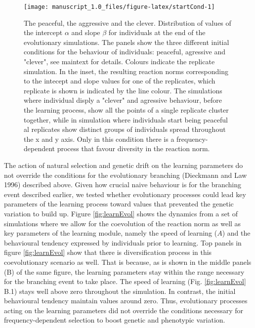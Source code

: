 \documentclass[
  12pt,
]{article}
\begin{document}
\begin{figure}

{\centering \texttt{[image: manuscript\_1.0\_files/figure-latex/startCond-1]} 

}

\caption{The peaceful, the aggressive and the clever. Distribution of values of the intercept $\alpha$ and slope $\beta$ for individuals at the end of the evolutionary simulations. The panels show the three different initial conditions for the behaviour of individuals: peaceful, agressive and  "clever", see maintext for details. Colours indicate the replicate simulation. In the inset, the resulting reaction norms corresponding to the intecept and slope values for one of the replicates, which replicate is shown is indicated by the line colour. The simulations where individual disply a "clever" and agressive behaviour, before the learning process, show all the points of a single replicate cluster together, while in simulation where individuals start being peaceful al replicates show distinct groups of individuals spread throughout the x and y axis. Only in this condition there is a frequency-dependent process that favour diversity in the reaction norm.}\label{fig:startCond}
\end{figure}

The action of natural selection and genetic drift on the learning
parameters do not override the conditions for the evolutionary branching
(Dieckmann and Law 1996) described above. Given how crucial naive
behaviour is for the branching event described earlier, we tested
whether evolutionary processes could lead key parameters of the learning
process toward values that prevented the genetic variation to build up.
Figure \ref{fig:learnEvol} shows the dynamics from a set of simulations
where we allow for the coevolution of the reaction norm as well as key
parameters of the learning module, namely the speed of learning (\(A\))
and the behavioural tendency expressed by individuals prior to learning.
Top panels in figure \ref{fig:learnEvol} show that there is
diversification process in this coevolutionary scenario as well. That is
because, as is shown in the middle panels (B) of the same figure, the
learning parameters stay within the range necessary for the branching
event to take place. The speed of learning (Fig. \ref{fig:learnEvol}
B.1) stays well above zero throughout the simulation. In contrast, the
initial behavioural tendency maintain values around zero. Thus,
evolutionary processes acting on the learning parameters did not
override the conditions necessary for frequency-dependent selection to
boost genetic and phenotypic variation.
\end{document}
